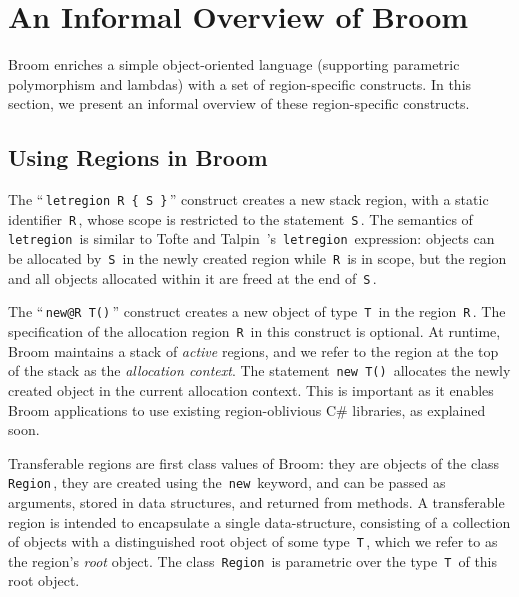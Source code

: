 \documentclass[a4paper,UKenglish]{lipics-v2018}
\newcommand{\C}[1]{\code{#1}}
\newcommand{\code}[1]{\,{\tt #1}\,}
\newcommand{\name}{{\sc Broom}\xspace}
\begin{document}
\newcommand{\COMMENT}[1]{}

\section{An Informal Overview of \name} \label{sec:overview}

\name enriches a simple object-oriented language (supporting
parametric polymorphism and lambdas) with a set of region-specific
constructs.  In this section, we present an informal overview of these
region-specific constructs.

\subsection{Using Regions in \name}
\label{sec:alloc-ctxt}

 The ``\C{letregion R \{ S \}}'' construct
creates a new stack region, with a static identifier \C{R}, whose
scope is restricted to the statement \C{S}. The semantics of
\C{letregion} is similar to Tofte and Talpin~\cite{tofte94}'s
\C{letregion} expression: objects can be allocated by \C{S} in the
newly created region while \C{R} is in scope, but the region and all
objects allocated within it are freed at the end of \C{S}.

 The ``\C{new@R T()}'' construct creates
a new object of type \C{T} in the region \C{R}. The specification of
the allocation region \C{R} in this construct is optional.  At
runtime, \name maintains a stack of \emph{active} regions, and we
refer to the region at the top of the stack as the \emph{allocation
context}. The statement \C{new T()} allocates the newly created object
in the current allocation context.
%
This is important as it enables \name applications to use existing
region-oblivious C\# libraries, as explained soon.

Transferable regions are first class values of \name: they are objects
of the class \C{Region}, they are created using the \C{new} keyword,
and can be passed as arguments, stored in data structures, and
returned from methods.  A transferable region is intended to
encapsulate a single data-structure, consisting of a collection of
objects with a distinguished root object of some type \C{T}, which we
refer to as the region's \emph{root} object.  The class \C{Region} is
parametric over the type \C{T} of this root object.
\end{document}
